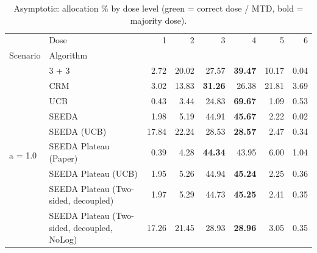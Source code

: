 \begin{table}[H]
\centering
\caption{Asymptotic: allocation \% by dose level (green = correct dose / MTD, bold = majority dose).}
\label{tab:asym_alloc_by_dose}
\begin{tabular}{llrrrrrr}
\toprule
 & Dose & 1 & 2 & 3 & 4 & 5 & 6 \\
Scenario & Algorithm &  &  &  &  &  &  \\
\midrule
\multirow[c]{9}{*}{a = 1.0} & 3 + 3 & 2.72 & 20.02 & {\cellcolor[HTML]{C8E6C9}} 27.57 & \bfseries 39.47 & 10.17 & 0.04 \\
 & CRM & 3.02 & 13.83 & {\cellcolor[HTML]{C8E6C9}} \bfseries 31.26 & 26.38 & 21.81 & 3.69 \\
 & UCB & 0.43 & 3.44 & {\cellcolor[HTML]{C8E6C9}} 24.83 & \bfseries 69.67 & 1.09 & 0.53 \\
 & SEEDA & 1.98 & 5.19 & {\cellcolor[HTML]{C8E6C9}} 44.91 & \bfseries 45.67 & 2.22 & 0.02 \\
 & SEEDA (UCB) & 17.84 & 22.24 & {\cellcolor[HTML]{C8E6C9}} 28.53 & \bfseries 28.57 & 2.47 & 0.34 \\
 & SEEDA Plateau (Paper) & 0.39 & 4.28 & {\cellcolor[HTML]{C8E6C9}} \bfseries 44.34 & 43.95 & 6.00 & 1.04 \\
 & SEEDA Plateau (UCB) & 1.95 & 5.26 & {\cellcolor[HTML]{C8E6C9}} 44.94 & \bfseries 45.24 & 2.25 & 0.36 \\
 & SEEDA Plateau (Two-sided, decoupled) & 1.97 & 5.29 & {\cellcolor[HTML]{C8E6C9}} 44.73 & \bfseries 45.25 & 2.41 & 0.35 \\
 & SEEDA Plateau (Two-sided, decoupled, NoLog) & 17.26 & 21.45 & {\cellcolor[HTML]{C8E6C9}} 28.93 & \bfseries 28.96 & 3.05 & 0.35 \\
\bottomrule
\end{tabular}
\end{table}

